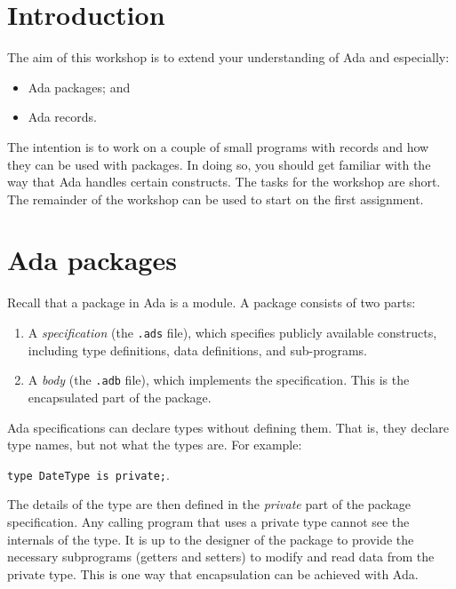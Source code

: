 \documentclass{article}
\begin{document}
%


\section*{Introduction}
\label{section:introduction}

The aim of this workshop is to extend your understanding of Ada and
especially:

\begin{itemize}
  \item Ada packages; and 
  \item Ada records.
\end{itemize}

The intention is to work on a couple of small programs with records and how they can be used with packages. In doing so, you should get familiar with the way that Ada handles certain constructs. The tasks for the workshop are short. The remainder of the workshop can be used to start on the first assignment.

\section*{Ada packages}

Recall that a package in Ada is a module. A package consists of two parts:
\begin{enumerate}
 \item A \emph{specification} (the \texttt{.ads} file), which specifies publicly available constructs, including type definitions, data definitions, and sub-programs.
 \item A \emph{body} (the \texttt{.adb} file), which implements the specification.  This is the encapsulated part of the package.
\end{enumerate} 

Ada specifications can declare types without defining them. That is, they declare type names, but not what the types are. For example:

\quad\quad \texttt{type DateType is private;}.

The details of the type are then defined in the \emph{private} part of the package specification. Any calling program that uses a private type cannot see the internals of the type. It is up to the designer of the package to provide the necessary subprograms (getters and setters) to modify and read data from the private type. This is one way that encapsulation can be achieved with Ada.
\end{document}
